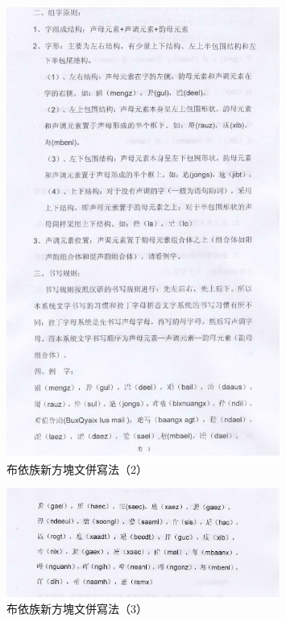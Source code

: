 \documentclass[a5paper, 10pt, openany]{book} %
\begin{document}
\begin{figure}[h]
  \centering
  \includegraphics[width=0.8\textwidth]{./images/aros_buyizu_3.png}
  \caption{布依族新方塊文併寫法（2）}
\end{figure}

 
\begin{figure}[h]
  \centering
  \includegraphics[width=0.8\textwidth]{./images/aros_buyizu_4.png}
  \caption{布依族新方塊文併寫法（3）}
\end{figure}
 
\end{document}
